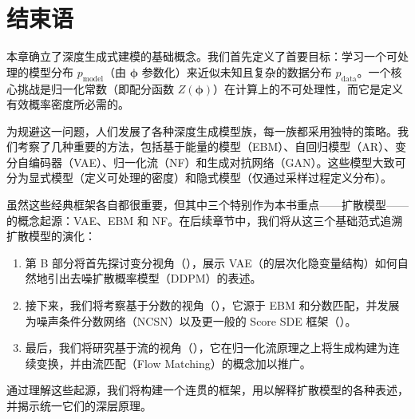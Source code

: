 \newpage
\section{结束语}\label{sec:ch1_cr}


本章确立了深度生成式建模的基础概念。我们首先定义了首要目标：学习一个可处理的模型分布 $p_{\text{model}}$（由 $\bm{\phi}$ 参数化）来近似未知且复杂的数据分布 $p_{\text{data}}$。一个核心挑战是归一化常数（即配分函数 $Z(\bm{\phi})$）在计算上的不可处理性，而它是定义有效概率密度所必需的。



为规避这一问题，人们发展了各种深度生成模型族，每一族都采用独特的策略。我们考察了几种重要的方法，包括基于能量的模型（EBM）、自回归模型（AR）、变分自编码器（VAE）、归一化流（NF）和生成对抗网络（GAN）。这些模型大致可分为显式模型（定义可处理的密度）和隐式模型（仅通过采样过程定义分布）。




虽然这些经典框架各自都很重要，但其中三个特别作为本书重点——扩散模型——的概念起源：VAE、EBM 和 NF。在后续章节中，我们将从这三个基础范式追溯扩散模型的演化：
\begin{enumerate}
    \item 第 B 部分将首先探讨变分视角（），展示 VAE（的层次化隐变量结构）如何自然地引出去噪扩散概率模型（DDPM）的表述。
    \item 接下来，我们将考察基于分数的视角（），它源于 EBM 和分数匹配，并发展为噪声条件分数网络（NCSN）以及更一般的 Score SDE 框架（）。
    \item 最后，我们将研究基于流的视角（），它在归一化流原理之上将生成构建为连续变换，并由流匹配（Flow Matching）的概念加以推广。
\end{enumerate}

通过理解这些起源，我们将构建一个连贯的框架，用以解释扩散模型的各种表述，并揭示统一它们的深层原理。
